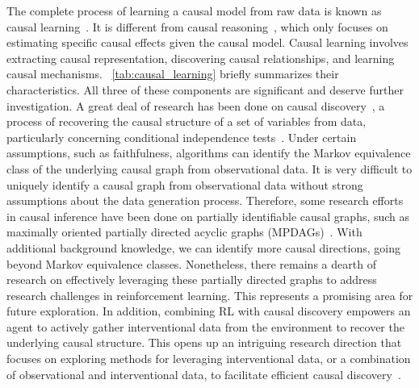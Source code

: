 \documentclass[10pt]{article} %
\theoremstyle{definition}
\begin{document}
The complete process of learning a causal model from raw data is known as causal learning~\citep{petersElementsCausalInference2017}. It is different from causal reasoning~\citep{imbensCausalInferenceStatistics2015,glymourCausalInferenceStatistics2016}, which only focuses on estimating specific causal effects given the causal model. Causal learning involves extracting causal representation, discovering causal relationships, and learning causal mechanisms. \tablename~\ref{tab:causal_learning} briefly summarizes their characteristics. All three of these components are significant and deserve further investigation. A great deal of research has been done on causal discovery~\citep{spirtesCausationPredictionSearch2000, pearlCausality2009, petersElementsCausalInference2017,vowelsYaDAGsSurvey2022}, a process of recovering the causal structure of a set of variables from data, particularly concerning conditional independence tests~\citep{spirtesCausationPredictionSearch2000,sunKernelbasedCausalLearning2007,hoyerNonlinearCausalDiscovery2008,zhangKernelbasedConditionalIndependence2011}. Under certain assumptions, such as faithfulness, algorithms can identify the Markov equivalence class of the underlying causal graph from observational data. 
It is very difficult to uniquely identify a causal graph from observational data without strong assumptions about the data generation process. Therefore, some research efforts in causal inference have been done on partially identifiable causal graphs, such as maximally oriented partially directed acyclic graphs (MPDAGs)~\citep{meekCausalInferenceCausal1995,perkovicInterpretingUsingCPDAGs2017,perkovicIdentifyingCausalEffects2020}. With additional background knowledge, we can identify more causal directions, going beyond Markov equivalence classes. Nonetheless, there remains a dearth of research on effectively leveraging these partially directed graphs to address research challenges in reinforcement learning. This represents a promising area for future exploration.
In addition, combining RL with causal discovery empowers an agent to actively gather interventional data from the environment to recover the underlying causal structure. This opens up an intriguing research direction that focuses on exploring methods for leveraging interventional data, or a combination of observational and interventional data, to facilitate efficient causal discovery~\citep{addankiEfficientInterventionDesign2020, jaberCausalDiscoverySoft2020a, brouillardDifferentiableCausalDiscovery2020, zhuCausalDiscoveryReinforcement2022}.
\end{document}
